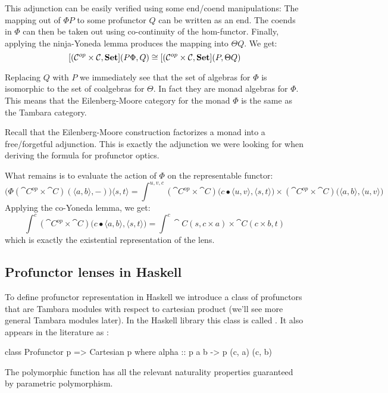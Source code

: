 \documentclass[DaoFP]{subfiles}
\begin{document}
This adjunction can be easily verified using some end/coend manipulations: The mapping out of $\Phi P$ to some profunctor $Q$ can be written as an end. The coends in $\Phi$ can then be taken out using co-continuity of the hom-functor. Finally, applying the ninja-Yoneda lemma produces the mapping into $\Theta Q$. We get:
\[ [(\mathcal{C}^{op} \times \mathcal{C}, \mathbf{Set}] (P \Phi, Q) \cong [(\mathcal{C}^{op} \times \mathcal{C}, \mathbf{Set}] (P, \Theta Q) \]

Replacing $Q$ with $P$ we immediately see that the set of algebras for $\Phi$ is isomorphic to the set of coalgebras for $\Theta$. In fact they are monad algebras for $\Phi$. This means that the Eilenberg-Moore category for the monad $\Phi$ is the same as the Tambara category.

Recall that the Eilenberg-Moore construction factorizes a monad into a free/forgetful adjunction. This is exactly the adjunction we were looking for when deriving the formula for profunctor optics. 

What remains is to evaluate the action of $\Phi$ on the representable functor:
\[ \big( \Phi (\cat C^{op} \times \cat C) (\langle a, b\rangle ,-) \big) \langle s, t\rangle = \int^{u, v, c} (\cat C^{op} \times \cat C) \big(c \bullet \langle u, v\rangle , \langle s, t \rangle \big) \times  (\cat C^{op} \times \cat C) \big(\langle a, b\rangle , \langle u, v\rangle \big)\]
Applying the co-Yoneda lemma, we get:
\[ \int^c (\cat C^{op} \times \cat C) \big(c \bullet \langle a, b\rangle , \langle s, t \rangle\big) = \int^c \cat C(s, c \times a) \times \cat C (c \times b, t)\]
which is exactly the existential representation of the lens.

\subsection{Profunctor lenses in Haskell}

To define profunctor representation in Haskell we introduce a class of profunctors that are Tambara modules with respect to cartesian product (we'll see more general Tambara modules later). In the Haskell library this class is called . It also appears in the literature as :
\begin{haskell}
class Profunctor p => Cartesian p where
  alpha :: p a b -> p (c, a) (c, b)
\end{haskell}
The polymorphic function  has all the relevant naturality properties guaranteed by parametric polymorphism. 
\end{document}
